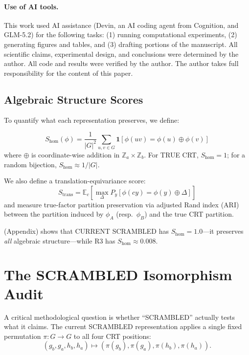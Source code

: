 \documentclass[11pt,a4paper]{article}
\theoremstyle{definition}
\theoremstyle{remark}
\newcommand{\Z}{\mathbb{Z}}
\newcommand{\E}{\mathbb{E}}
\newcommand{\Shom}{S_{\mathrm{hom}}}
\newcommand{\Strans}{S_{\mathrm{trans}}}
\begin{document}
\paragraph{Use of AI tools.} This work used AI assistance (Devin, an AI coding agent from Cognition, and GLM-5.2) for the following tasks: (1) running computational experiments, (2) generating figures and tables, and (3) drafting portions of the manuscript. All scientific claims, experimental design, and conclusions were determined by the author. All code and results were verified by the author. The author takes full responsibility for the content of this paper.

\subsection{Algebraic Structure Scores}
\label{sec:structure_scores}

To quantify what each representation preserves, we define:

\begin{equation}
    \Shom(\phi) = \frac{1}{|G|^2} \sum_{u,v \in G} \mathbf{1}[\phi(uv) = \phi(u) \oplus \phi(v)]
\end{equation}
where $\oplus$ is coordinate-wise addition in $\Z_a \times \Z_b$. For TRUE CRT, $\Shom = 1$; for a random bijection, $\Shom \approx 1/|G|$.

We also define a translation-equivariance score:
\begin{equation}
    \Strans = \E_c \left[\max_\Delta P_y[\phi(cy) = \phi(y) \oplus \Delta]\right]
\end{equation}
and measure true-factor partition preservation via adjusted Rand index (ARI) between the partition induced by $\phi_A$ (resp.\ $\phi_B$) and the true CRT partition.

 (Appendix) shows that CURRENT SCRAMBLED has $\Shom = 1.0$---it preserves \emph{all} algebraic structure---while R3 has $\Shom \approx 0.008$.

\section{The SCRAMBLED Isomorphism Audit}
\label{sec:audit}

A critical methodological question is whether ``SCRAMBLED'' actually tests what it claims. The current SCRAMBLED representation applies a single fixed permutation $\pi: G \to G$ to all four CRT positions:
\begin{equation}
    (g_b, g_a, h_b, h_a) \mapsto (\pi(g_b), \pi(g_a), \pi(h_b), \pi(h_a)).
\end{equation}
\end{document}
